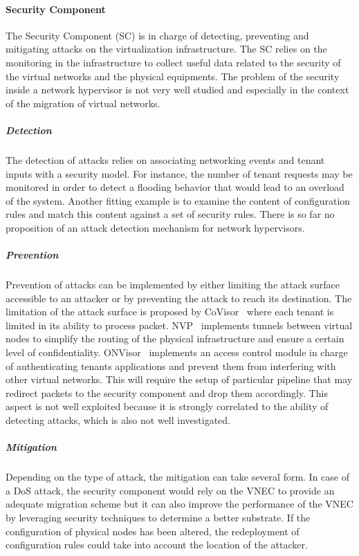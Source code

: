 \paragraph{Security Component}
The Security Component (SC) is in charge of detecting, preventing and mitigating attacks on the virtualization infrastructure. The SC relies on the monitoring in the infrastructure to collect useful data related to the security of the virtual networks and the physical equipments.
The problem of the security inside a network hypervisor is not very well studied and especially in the context of the migration of virtual networks.

\subparagraph{Detection}
The detection of attacks relies on associating networking events and tenant inputs with a security model.
For instance, the number of tenant requests may be monitored in order to detect a flooding behavior that would lead to an overload of the system. Another fitting example is to examine the content of configuration rules and match this content against a set of security rules.
There is so far no proposition of an attack detection mechanism for network hypervisors.

\subparagraph{Prevention}
Prevention of attacks can be implemented by either limiting the attack surface accessible to an attacker or by preventing the attack to reach its destination. The limitation of the attack surface is proposed by CoVisor~\cite{CoVisor-Jin2015} where each tenant is limited in its ability to process packet.
NVP~\cite{NVP-Koponen2014} implements tunnels between virtual nodes to simplify the routing of the physical infrastructure and ensure a certain level of confidentiality.
ONVisor~\cite{ONVisor-Han2018} implements an access control module in charge of authenticating tenants applications and prevent them from interfering with other virtual networks.
This will require the setup of particular pipeline that may redirect packets to the security component and drop them accordingly. This aspect is not well exploited because it is strongly correlated to the ability of detecting attacks, which is also not well investigated. 

\subparagraph{Mitigation}
Depending on the type of attack, the mitigation can take several form. 
In case of a DoS attack, the security component would rely on the VNEC to provide an adequate migration scheme but it can also improve the performance of the VNEC by leveraging security techniques to determine a better substrate. 
If the configuration of physical nodes has been altered, the redeployment of configuration rules could take into account the location of the attacker.

